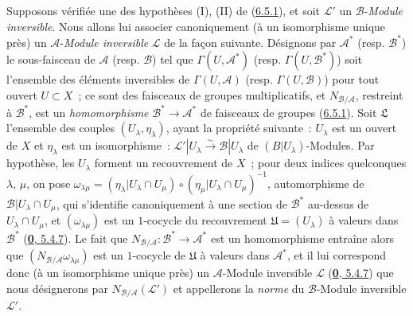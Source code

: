 \begin{env}[6.5.2]
\label{II.6.5.2-fr}
Supposons vérifiée une des hypothèses (I), (II) de
(\hyperref[II.6.5.1-fr]{6.5.1}), et soit $\mathcal{L}'$ un
$\mathcal{B}$-\emph{Module inversible}. Nous allons lui associer canoniquement
(à un isomorphisme unique près) un $\mathcal{A}$-\emph{Module inversible}
$\mathcal{L}$ de la façon suivante. Désignons par $\mathcal{A}^*$ (resp.
$\mathcal{B}^*$) le sous-faisceau de $\mathcal{A}$ (resp. $\mathcal{B}$) tel
que $\Gamma(U,\mathcal{A}^*)$ (resp. $\Gamma(U,\mathcal{B}^*)$) soit
l'ensemble des
éléments inversibles de $\Gamma(U,\mathcal{A})$ (resp.
$\Gamma(U,\mathcal{B})$) pour tout ouvert $U\subset X$~; ce sont des faisceaux
de groupes multiplicatifs, et $N_{\mathcal{B}/\mathcal{A}}$, restreint à
$\mathcal{B}^*$, est un \emph{homomorphisme}
$\mathcal{B}^*\to\mathcal{A}^*$ de faisceaux de groupes
(\hyperref[II.6.5.1-fr]{6.5.1}). Soit $\mathfrak{L}$ l'ensemble des couples
$(U_\lambda,\eta_\lambda)$, ayant la propriété suivante~: $U_\lambda$ est un
ouvert de $X$ et $\eta_\lambda$ est un isomorphisme~:
$\mathcal{L}'|U_\lambda\xrightarrow{\sim}\mathcal{B}|U_\lambda$ de
$(B|U_\lambda)$-Modules. Par hypothèse, les $U_\lambda$ forment un
recouvrement de $X$~; pour deux indices quelconques $\lambda$, $\mu$, on pose
$\omega_{\lambda\mu}=(\eta_\lambda|U_\lambda\cap U_\mu)
\circ(\eta_\mu|U_\lambda\cap U_\mu)^{-1}$, automorphisme de
$\mathcal{B}|U_\lambda\cap U_\mu$, qui s'identifie canoniquement à une section
de $\mathcal{B}^*$ au-dessus de $U_\lambda\cap U_\mu$, et
$(\omega_{\lambda\mu})$ est un $1$-cocycle du recouvrement
$\mathfrak{U}=(U_\lambda)$ à valeurs dans $\mathcal{B}^*$
(\hyperref[0.5.4.7-fr]{\textbf{0}, 5.4.7}). Le fait que
$N_{\mathcal{B}/\mathcal{A}}:\mathcal{B}^*\to\mathcal{A}^*$ est un
homomorphisme entraîne alors que
$(N_{\mathcal{B}/\mathcal{A}}\omega_{\lambda\mu})$ est un $1$-cocycle de
$\mathfrak{U}$ à valeurs dans $\mathcal{A}^*$, et il lui correspond donc (à un
isomorphisme unique près) un $\mathcal{A}$-Module inversible $\mathcal{L}$
(\hyperref[0.5.4.7-fr]{\textbf{0}, 5.4.7}) que nous désignerons par
$N_{\mathcal{B}/\mathcal{A}}(\mathcal{L}')$ et appellerons la \emph{norme} du
$\mathcal{B}$-Module inversible $\mathcal{L}'$.


\end{env}
